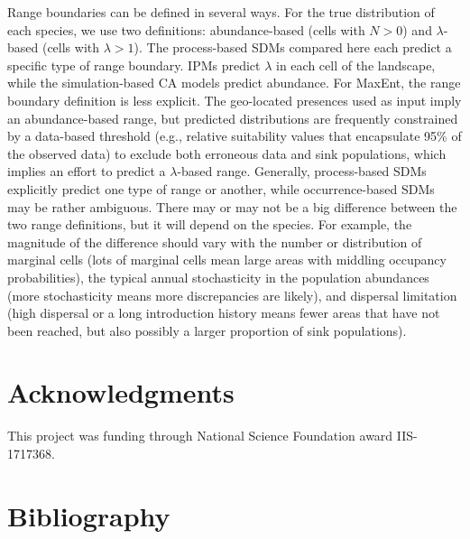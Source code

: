 \documentclass[preprint,review,times,12pt]{elsarticle}
\begin{document}
Range boundaries can be defined in several ways. For the true distribution of each species, we use two definitions: abundance-based (cells with $N > 0$) and $\lambda$-based (cells with $\lambda > 1$). The process-based SDMs compared here each predict a specific type of range boundary. IPMs predict $\lambda$ in each cell of the landscape, while the simulation-based CA models predict abundance. For MaxEnt, the range boundary definition is less explicit. The geo-located presences used as input imply an abundance-based range, but predicted distributions are frequently constrained by a data-based threshold (e.g., relative suitability values that encapsulate 95\% of the observed data) to exclude both erroneous data and sink populations, which implies an effort to predict a $\lambda$-based range. Generally, process-based SDMs explicitly predict one type of range or another, while occurrence-based SDMs may be rather ambiguous. There may or may not be a big difference between the two range definitions, but it will depend on the species. For example, the magnitude of the difference should vary with the number or distribution of marginal cells (lots of marginal cells mean large areas with middling occupancy probabilities), the typical annual stochasticity in the population abundances (more stochasticity means more discrepancies are likely), and dispersal limitation (high dispersal or a long introduction history means fewer areas that have not been reached, but also possibly a larger proportion of sink populations). 



\section{Acknowledgments}
This project was funding through National Science Foundation award IIS-1717368. 


\section{Bibliography}
\end{document}
